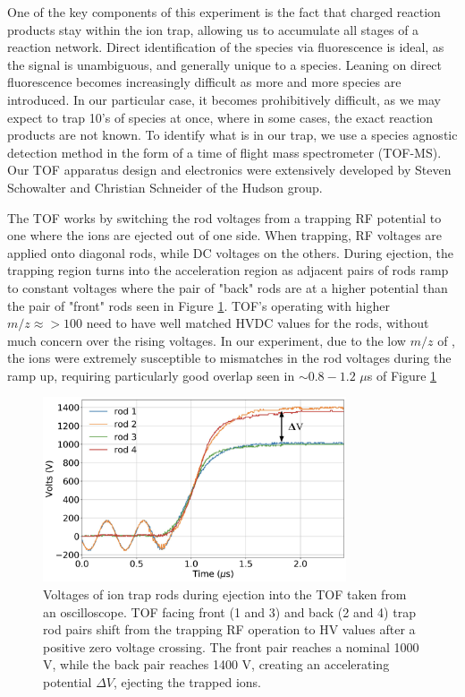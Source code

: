 One of the key components of this experiment is the fact that charged reaction products stay within the ion trap, allowing us to accumulate all stages of a reaction network. Direct identification of the species via fluorescence is ideal, as the signal is unambiguous, and generally unique to a species. Leaning on direct fluorescence becomes increasingly difficult as more and more species are introduced. In our particular case, it becomes prohibitively difficult, as we may expect to trap 10's of species at once, where in some cases, the exact reaction products are not known. To identify what is in our trap, we use a species agnostic detection method in the form of a time of flight mass spectrometer (TOF-MS). Our TOF apparatus design and electronics were extensively developed by Steven Schowalter and Christian Schneider of the Hudson group.\cite{Schowalter2012,Schneider2014}

The TOF works by switching the rod voltages from a trapping RF potential to one where the ions are ejected out of one side. When trapping, RF voltages are applied onto diagonal rods, while DC voltages on the others. During ejection, the trapping region turns into the acceleration region as adjacent pairs of rods ramp to constant voltages where the pair of "back" rods are at a higher potential than the pair of "front" rods seen in Figure \ref{fig: rod traces}. TOF's operating with higher $m/z \approx>100 $ need to have well matched HVDC values for the rods, without much concern over the rising voltages. In our experiment, due to the low $m/z$ of , the ions were extremely susceptible to mismatches in the rod voltages during the ramp up, requiring particularly good overlap seen in $\sim 0.8 - 1.2$ $\mu$s of Figure \ref{fig: rod traces}

\begin{figure}
	\centering
	\includegraphics[width=0.8\textwidth]{images/rod_traces.pdf}
	\caption{Voltages of ion trap rods during ejection into the TOF taken from an oscilloscope. TOF facing front (1 and 3) and back (2 and 4) trap rod pairs shift from the trapping RF operation to HV values after a positive zero voltage crossing. The front pair reaches a nominal 1000 V, while the back pair reaches 1400 V, creating an accelerating potential $\Delta V$, ejecting the trapped ions.}
	\label{fig: rod traces}
\end{figure}


